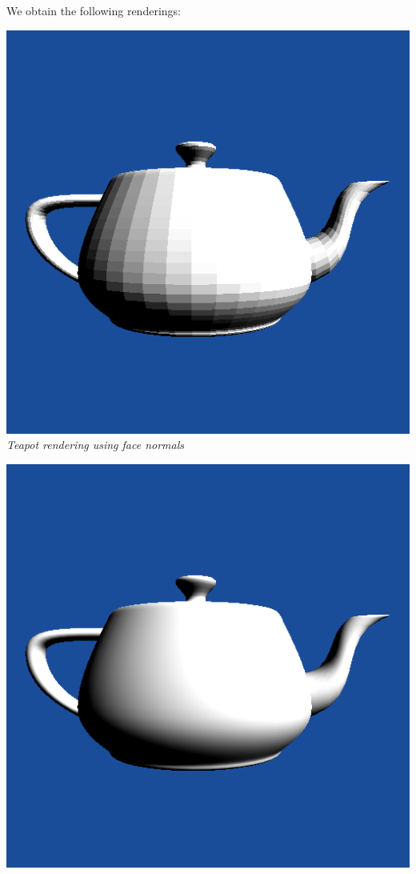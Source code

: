 \documentclass[a4,12pt]{article}
\begin{document}
	We obtain the following renderings:
	\begin{center}
		\begin{minipage}[b]{0.40\linewidth}
			\begin{center}
				\includegraphics[width = \textwidth]{./Worksheet4/teapot_raw.png}\\
				\textit{Teapot rendering using face normals
					\vspace{2.2em}}\\
			\end{center}
		\end{minipage}
		\hspace{0.05\linewidth}
		\begin{minipage}[b]{0.40\linewidth}
			\begin{center}
				\includegraphics[width =\textwidth]{./Worksheet4/teapot_smooth.png}\\

\end{center}
\end{minipage}
\end{center}
\end{document}
